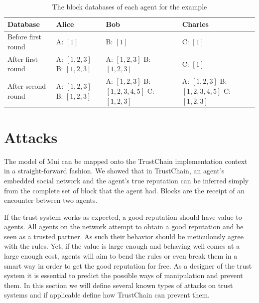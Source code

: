 \begin{table}[h!]
    \centering
    \caption{The block databases of each agent for the example}
    \label{tab:blocks_example}
    \begin{tabular}{p{4cm}|p{3cm}|p{4cm}|p{3cm}}
        \toprule
        Database & Alice & Bob & Charles \\
        \midrule
        Before first round & A: $[1]$ & B: $[1]$ & C: $[1]$ \\ \hline 
        After first round & A: $[1, 2, 3]$ \newline B: $[1, 2, 3]$ & A: $[1, 2, 3]$ \newline B: $[1, 2, 3]$ & C: $[1]$ \\ \hline
        After second round &  A: $[1, 2, 3]$ \newline B: $[1, 2, 3]$ & A: $[1, 2, 3]$ \newline B: $[1, 2, 3, 4, 5]$ \newline C: $[1, 2, 3]$ & A: $[1, 2, 3]$ \newline B: $[1, 2, 3, 4, 5]$ \newline C: $[1, 2, 3]$ \\
        \bottomrule
    \end{tabular}
\end{table}

\section{Attacks}
\label{sec:attacks}
The model of Mui can be mapped onto the TrustChain implementation context in a straight-forward 
fashion. We showed that in TrustChain, an agent's embedded social network 
and the agent's true reputation can be inferred simply from the complete set of block that 
the agent had. Blocks are the receipt of an encounter between two agents. 

If the trust system works as expected, a good reputation should have value to agents. All agents on 
the network attempt to obtain a good reputation and be seen as a trusted partner. As such their 
behavior should be meticulously agree with the rules. Yet, if the value is large enough and behaving
well comes at a large enough cost, agents will aim to bend the rules or even break them in a smart 
way in order to get the good reputation for free. As a designer of the trust system it is essential
to predict the possible ways of manipulation and prevent them. In this section we will define several
known types of attacks on trust systems and if applicable define how TrustChain can prevent them.

